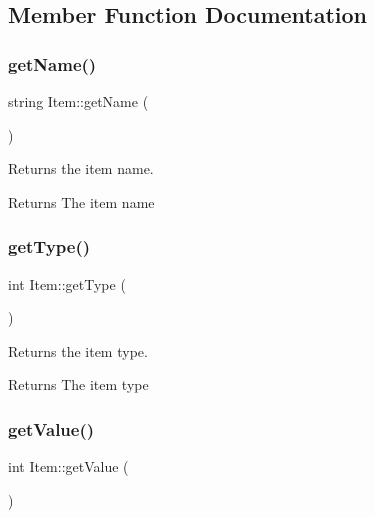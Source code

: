 \subsection{Member Function Documentation}
\mbox{\label{class_item_a63d7f2148b699e539aae354b01559811}} 
\subsubsection{\texorpdfstring{getName()}{getName()}}
{\footnotesize\ttfamily string Item\+::get\+Name (\begin{DoxyParamCaption}{ }\end{DoxyParamCaption})}



Returns the item name. 

\begin{DoxyReturn}{Returns}
The item name 
\end{DoxyReturn}
\mbox{\label{class_item_ae6ecba9b0f87146e4062bb4ad4f712b5}} 
\subsubsection{\texorpdfstring{getType()}{getType()}}
{\footnotesize\ttfamily int Item\+::get\+Type (\begin{DoxyParamCaption}{ }\end{DoxyParamCaption})}



Returns the item type. 

\begin{DoxyReturn}{Returns}
The item type 
\end{DoxyReturn}
\mbox{\label{class_item_a9ceb9a0df0efe18d23e347471f908be7}} 
\subsubsection{\texorpdfstring{getValue()}{getValue()}}
{\footnotesize\ttfamily int Item\+::get\+Value (\begin{DoxyParamCaption}{ }\end{DoxyParamCaption})}



